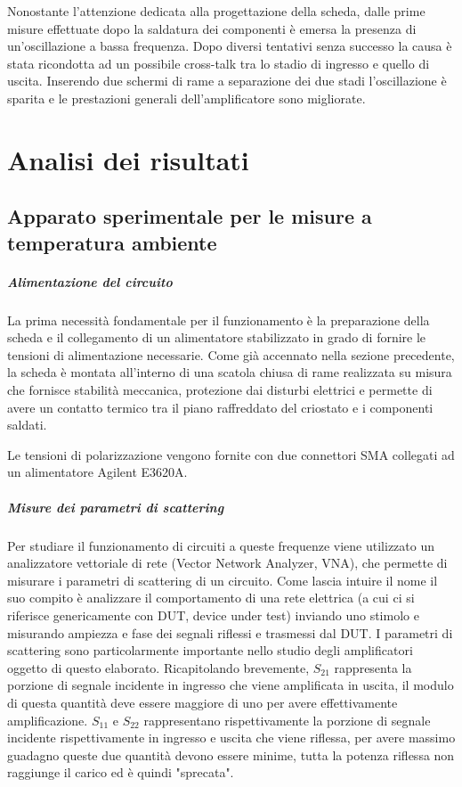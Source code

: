\documentclass[12pt,oneside]{book}
\begin{document}
Nonostante l'attenzione dedicata alla progettazione della scheda, dalle prime misure effettuate dopo la saldatura dei componenti è emersa la presenza di un'oscillazione a bassa frequenza. Dopo diversi tentativi senza successo la causa è stata ricondotta ad un possibile cross-talk tra lo stadio di ingresso e quello di uscita. Inserendo due schermi di rame a separazione dei due stadi l'oscillazione è sparita e le prestazioni generali dell'amplificatore sono migliorate.

\chapter{Analisi dei risultati}
\label{sect_results}

\section{Apparato sperimentale per le misure a temperatura ambiente}
\paragraph{Alimentazione del circuito}
La prima necessità fondamentale per il funzionamento è la preparazione della scheda e il collegamento di un alimentatore stabilizzato in grado di fornire le tensioni di alimentazione necessarie.
Come già accennato nella sezione precedente, la scheda è montata all'interno di una scatola chiusa di rame realizzata su misura che fornisce stabilità meccanica, protezione dai disturbi elettrici e permette di avere un contatto termico tra il piano raffreddato del criostato e i componenti saldati.

Le tensioni di polarizzazione vengono fornite con due connettori SMA collegati ad un alimentatore Agilent E3620A.

\paragraph{Misure dei parametri di scattering} 
Per studiare il funzionamento di circuiti a queste frequenze viene utilizzato un analizzatore vettoriale di rete (Vector Network Analyzer, VNA), che permette di misurare i parametri di scattering di un circuito. Come lascia intuire il nome il suo compito è analizzare il comportamento di una rete elettrica (a cui ci si riferisce genericamente con DUT, device under test) inviando uno stimolo e misurando ampiezza e fase dei segnali riflessi e trasmessi dal DUT. I parametri di scattering sono particolarmente importante nello studio degli amplificatori oggetto di questo elaborato. Ricapitolando brevemente, $S_{21}$ rappresenta la porzione di segnale incidente in ingresso che viene amplificata in uscita, il modulo di questa quantità deve essere maggiore di uno per avere effettivamente amplificazione. $S_{11}$ e $S_{22}$ rappresentano rispettivamente la porzione di segnale incidente rispettivamente in ingresso e uscita che viene riflessa, per avere massimo guadagno queste due quantità devono essere minime, tutta la potenza riflessa non raggiunge il carico ed è quindi "sprecata".
\end{document}
